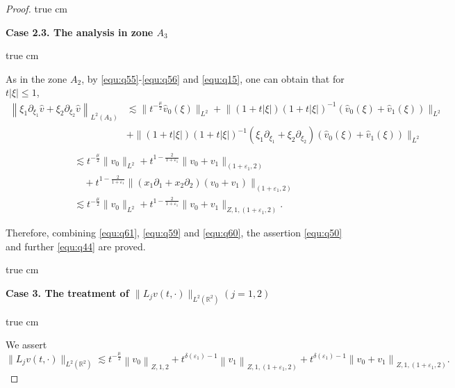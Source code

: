 \documentclass[11pt,twoside]{article}
\newcommand{\R}{\mathbb R}
\newcommand{\p}{\partial}
\newcommand{\f}{\frac}
\theoremstyle{plain}
\theoremstyle{definition}
\theoremstyle{remark}
\numberwithin{equation}{section}
\begin{document}
\begin{proof}
 true cm

{\bf Case 2.3.  The analysis  in zone $A_3$}

 true cm

As in the zone $A_2$, by \eqref{equ:q55}-\eqref{equ:q56} and \eqref{equ:q15}, one can obtain that for $t|\xi|\leq 1$,
\begin{equation*}\label{equ:q60}
\begin{aligned}
\left\|\xi_1\p_{\xi_1}\hat{v}+\xi_2\p_{\xi_2}\hat{v}\right\|_{L^2(A_3)}
&\lesssim \big\|t^{-\frac{\mu}{2}}\hat{v}_{0}(\xi)\big\|_{L^{2}}+\big\|(1+t|\xi|)(1+t|\xi|)^{-1}(\hat{v}_{0}(\xi)+\hat{v}_{1}(\xi))\big\|_{L^{2}}\\
&+\big\|(1+t|\xi|)(1+t|\xi|)^{-1}(\xi_1\p_{\xi_1}+\xi_2\p_{\xi_2})(\hat{v}_{0}(\xi)+\hat{v}_{1}(\xi))\big\|_{L^{2}}\\
\end{aligned}
\end{equation*}
\begin{equation}\label{equ:q60}
\begin{aligned}
&\lesssim  t^{-\frac{\mu}{2}}\big\|v_{0}\big\|_{L^{2}}+ t^{1-\f{2}{1+\varepsilon_1}}\big\|v_0+v_1\big\|_{(1+\varepsilon_1, 2)}\\
&\quad+t^{1-\f{2}{1+\varepsilon_1}}\big\|(x_1\p_1+x_2\p_2)(v_0+v_1)\big\|_{(1+\varepsilon_1, 2)}\\
&\lesssim t^{-\frac{\mu}{2}}\big\|v_{0}\big\|_{L^{2}}+ t^{1-\f{2}{1+\varepsilon_1}}\big\|v_0+v_1\big\|_{Z, 1, (1+\varepsilon_1, 2)}.
\end{aligned}
\end{equation}

Therefore, combining \eqref{equ:q61}, \eqref{equ:q59} and \eqref{equ:q60},
the assertion \eqref{equ:q50} and further \eqref{equ:q44} are proved.

 true cm

{\bf Case 3.  The treatment  of $\|L_jv(t, \cdot)\|_{L^2(\R^2)}(j=1, 2)$ }

 true cm

We assert
\begin{equation}\label{equ:q62}
\|L_jv(t, \cdot)\|_{L^2(\R^2)} \lesssim t^{-\f{\mu}{2}}\left\|v_0\right\|_{Z, 1, 2}+t^{\delta(\varepsilon_1)-1}\left\|v_1\right\|_{Z, 1,(1+\varepsilon_1, 2)}+t^{\delta(\varepsilon_1)-1}\left\|v_0+v_1\right\|_{Z, 1,(1+\varepsilon_1, 2)}.
\end{equation}


\end{proof}
\end{document}
